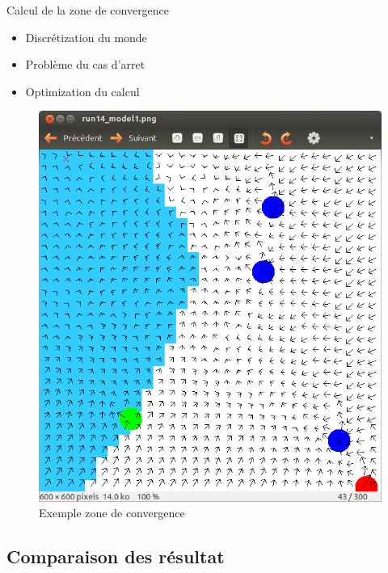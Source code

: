 \documentclass{beamer}
\begin{document}
\begin{frame}
  \begin{block}{Calcul de la zone de convergence}
    \begin{itemize}
      \item Discrétization du monde
      \item Problème du cas d'arret
      \item Optimization du calcul
    \end{itemize}
  \end{block}
  \begin{figure}
    \centering
    \includegraphics[scale=0.2]{exp.png}
    \caption{Exemple zone de convergence}
  \end{figure}
\end{frame}

\subsection{Comparaison des résultat}
\end{document}
